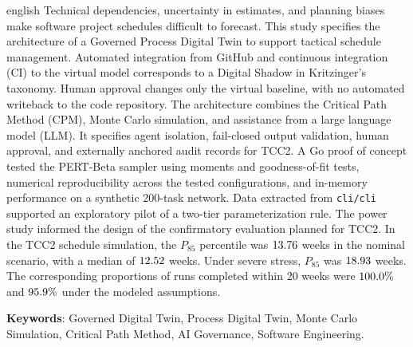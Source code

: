 \documentclass[12pt,openany,oneside,a4paper,english,brazilian,sumario=tradicional]{abntex2}
\begin{document}
\begin{resumo}[Abstract]
\begin{otherlanguage*}{english}
Technical dependencies, uncertainty in estimates, and planning biases make software project schedules difficult to forecast. This study specifies the architecture of a Governed Process Digital Twin to support tactical schedule management. Automated integration from GitHub and continuous integration (CI) to the virtual model corresponds to a Digital Shadow in Kritzinger's taxonomy. Human approval changes only the virtual baseline, with no automated writeback to the code repository. The architecture combines the Critical Path Method (CPM), Monte Carlo simulation, and assistance from a large language model (LLM). It specifies agent isolation, fail-closed output validation, human approval, and externally anchored audit records for TCC2. A Go proof of concept tested the PERT-Beta sampler using moments and goodness-of-fit tests, numerical reproducibility across the tested configurations, and in-memory performance on a synthetic 200-task network. Data extracted from \texttt{cli/cli} supported an exploratory pilot of a two-tier parameterization rule. The power study informed the design of the confirmatory evaluation planned for TCC2. In the TCC2 schedule simulation, the $P_{85}$ percentile was $13.76{}$ weeks in the nominal scenario, with a median of $12.52{}$ weeks. Under severe stress, $P_{85}$ was $18.93{}$ weeks. The corresponding proportions of runs completed within 20 weeks were $100.0{}\%$ and $95.9{}\%$ under the modeled assumptions.

\textbf{Keywords}: Governed Digital Twin, Process Digital Twin, Monte Carlo Simulation, Critical Path Method, AI Governance, Software Engineering.
\end{otherlanguage*}
\end{resumo}

\listoffigures*
\cleardoublepage
{}
\listoftables*
\cleardoublepage
\end{document}
